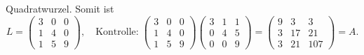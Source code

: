 \begin{beispiel}
Quadratwurzel. Somit ist
\[
L=
\begin{pmatrix}
3&0&0\\
1&4&0\\
1&5&9
\end{pmatrix}
,\quad\text{Kontrolle:}\;
\begin{pmatrix}
3&0&0\\
1&4&0\\
1&5&9
\end{pmatrix}
\begin{pmatrix}
3&1&1\\
0&4&5\\
0&0&9
\end{pmatrix}
=\begin{pmatrix}
9&3&3\\
3&17&21\\
3&21&107
\end{pmatrix}=A.
\]
\end{beispiel}

